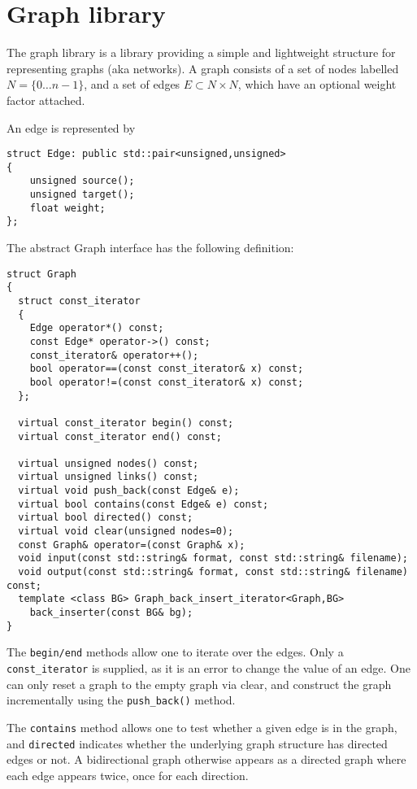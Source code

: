 \section{Graph library}

The \EcoLab{} graph library is a library providing a simple and
lightweight structure for representing graphs (aka networks). A graph
consists of a set of nodes labelled $N=\{0\ldots n-1\}$, and a set of
edges $E\subset N\times N$, which have an optional weight factor
attached.

An edge is represented by
\begin{verbatim}
struct Edge: public std::pair<unsigned,unsigned>
{
    unsigned source();
    unsigned target();
    float weight;
};
\end{verbatim}

The abstract Graph interface has the following definition:
\begin{verbatim}
struct Graph
{
  struct const_iterator
  {
    Edge operator*() const;
    const Edge* operator->() const;
    const_iterator& operator++();
    bool operator==(const const_iterator& x) const;
    bool operator!=(const const_iterator& x) const;
  };
 
  virtual const_iterator begin() const;
  virtual const_iterator end() const;

  virtual unsigned nodes() const;
  virtual unsigned links() const;
  virtual void push_back(const Edge& e);
  virtual bool contains(const Edge& e) const;
  virtual bool directed() const;
  virtual void clear(unsigned nodes=0);
  const Graph& operator=(const Graph& x);
  void input(const std::string& format, const std::string& filename);
  void output(const std::string& format, const std::string& filename) const;
  template <class BG> Graph_back_insert_iterator<Graph,BG>
    back_inserter(const BG& bg);
}
\end{verbatim}

The \verb+begin/end+ methods allow one to iterate over the edges. Only a \verb+const_iterator+
is supplied, as it is an error to change the value of an edge. One can
only reset a graph to the empty graph via clear, and construct the
graph incrementally using the \verb+push_back()+ method.

The \verb+contains+ method allows one to test whether a given edge is
in the graph, and \verb+directed+ indicates whether the underlying graph
structure has directed edges or not. A bidirectional graph otherwise
appears as a directed graph where each edge appears twice, once for
each direction.

